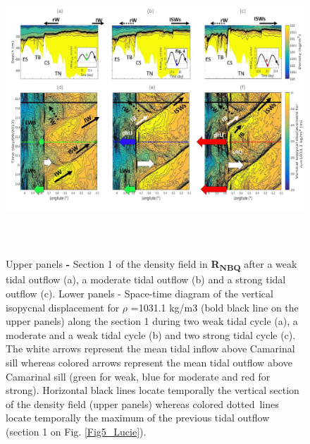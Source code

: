 \begin{figure}[!h]
	\begin{Center}
		\includegraphics[width=6.3in,height=4.32in]{./media/image6.jpg}
	\end{Center}


\caption{ Upper panels \textbf{- }Section 1 of the density field in \textbf{R\textsubscript{NBQ}} after a weak tidal outflow (a), a moderate tidal outflow (b) and a strong tidal outflow (c). Lower panels - Space-time diagram of the vertical isopycnal displacement for $ \rho $ =1031.1 kg/m3 (bold black line on the upper panels) along the section 1 during two weak tidal cycle (a), a moderate and a weak tidal cycle (b) and two strong tidal cycle (c). The white arrows represent the mean tidal inflow above Camarinal sill whereas colored arrows represent the mean tidal outflow above Camarinal sill (green for weak, blue for moderate and red for strong). Horizontal black lines locate temporally the vertical section of the density field (upper panels) whereas colored dotted\ lines locate temporally the maximum of the previous tidal outflow (section 1 on Fig.  \ref{Fig5_Lucie}). }
\label{Fig7_Lucie}
\end{figure}


%

